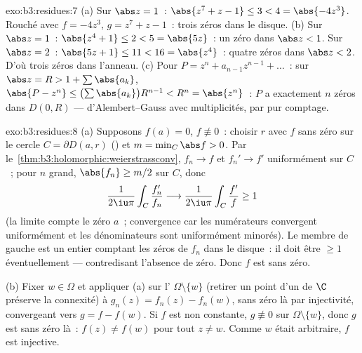 \begin{solution}{exo:b3:residues:7}
(a) Sur $\abs z = 1$~: $\abs{z^7 + z - 1} \leq 3 < 4 =
\abs{-4z^3}$. Rouché avec $f = -4z^3$, $g = z^7 + z - 1$~:
trois zéros dans le disque.
(b) Sur $\abs z = 1$~: $\abs{z^4 + 1} \leq 2 < 5 =
\abs{5z}$~: un zéro dans $\abs z < 1$. Sur $\abs z = 2$~:
$\abs{5z + 1} \leq 11 < 16 = \abs{z^4}$~: quatre zéros dans
$\abs z < 2$. D'où trois zéros dans l'anneau.
(c) Pour $P = z^n + a_{n-1}z^{n-1} + \dots$~: sur $\abs z =
R > 1 + \sum\abs{a_k}$, $\abs{P - z^n} \leq
\bigl(\sum\abs{a_k}\bigr)R^{n-1} < R^n = \abs{z^n}$~: $P$ a
exactement $n$ zéros dans $D(0, R)$ --- d'Alembert--Gauss
avec multiplicités, par pur comptage.
\end{solution}

\begin{solution}{exo:b3:residues:8}
(a) Supposons $f(a) = 0$, $f \not\equiv 0$~: choisir $r$
avec $f$ sans zéro sur le cercle $C = \partial D(a, r)$
() et $m = \min_C\abs f > 0$. Par
le~\cref{thm:b3:holomorphic:weierstrassconv}, $f_n \to f$ et
$f_n' \to f'$ uniformément sur $C$~; pour $n$ grand,
$\abs{f_n} \geq m/2$ sur $C$, donc
\[
\frac1{2\iu\pi}\int_C\frac{f_n'}{f_n}
\longrightarrow \frac1{2\iu\pi}\int_C\frac{f'}{f} \geq 1
\]
(la limite compte le zéro $a$~; convergence car les
numérateurs convergent uniformément et les dénominateurs
sont uniformément minorés). Le membre de gauche est un
entier comptant les zéros de $f_n$ dans le disque~: il doit
être $\geq 1$ éventuellement --- contredisant l'absence de
zéro. Donc $f$ est sans zéro.

(b) Fixer $w \in \Omega$ et appliquer (a) sur l'
 $\Omega\setminus\{w\}$ (retirer un point d'un
  de $\C$ préserve la connexité) à $g_n(z) =
f_n(z) - f_n(w)$, sans zéro là par injectivité, convergeant
vers $g = f - f(w)$. Si $f$ est non constante, $g
\not\equiv 0$ sur $\Omega\setminus\{w\}$, donc $g$ est sans
zéro là~: $f(z) \neq f(w)$ pour tout $z \neq w$. Comme $w$
était arbitraire, $f$ est injective.
\end{solution}

